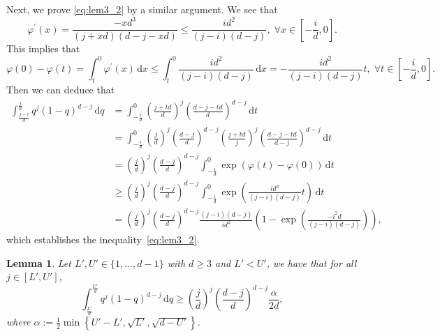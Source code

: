 \documentclass[onecolumn,letterpaper]{IEEEtran}
\newtheorem{lemma}{Lemma}
\newcommand{\cp}{{q}}
\newcommand{\up}{{U}}
\newcommand{\lw}{{L}}
\newcommand*{\dif}{{\,\mathrm{d}}}
\newcommand{\ap}{{\alpha}}
\newcommand{\gm}{{\varphi}}
\newcommand{\qp}{{t}}
\begin{document}
\begin{IEEEproof}
Next, we prove \eqref{eq:lem3_2} by a similar argument. We see that 
\begin{equation*}
\gm^\prime (x)  = \frac{-x d^3 }{(j+x d)(d-j-x d)} \le \frac{ i d^2 }{(j- i )(d-j)},\;\forall x \in \left[-\frac { i } {d},0\right]. 
\end{equation*}
This implies that 
\begin{equation*}
\gm(0)-\gm(\qp) = \int_\qp^0 \gm^\prime (x) \dif x \le \int_\qp^0 \frac{ i d^2 }{(j- i )(d-j)} \dif x = -\frac{ i d^2 }{(j- i )(d-j)} \qp,\;\forall \qp \in \left[-\frac  i  d,0\right].
\end{equation*}
Then we can deduce that 
\begin{align*}
\int_{\frac {j- i }{d} }^{\frac j d} \cp^j (1-\cp)^{d-j} \dif \cp &= \int_{-\frac { i } {d}}^0 \left( \frac{j+\qp d}{d} \right)^j \left( \frac{d-j-\qp d}{d} \right)^{d-j} \dif \qp \\ 
&= \int_{-\frac { i } {d}}^0 \left( \frac{j}{d} \right)^j \left( \frac{d-j}{d} \right)^{d-j}  \left( \frac{j+\qp d}{j} \right)^j \left( \frac{d-j-\qp d}{d-j} \right)^{d-j} \dif \qp \\ 
&= \left( \frac{j}{d} \right)^j \left( \frac{d-j}{d} \right)^{d-j}  \int_{-\frac { i } {d}}^0 \exp(\gm(\qp) - \gm(0)) \dif \qp \\ 
&\ge \left( \frac{j}{d} \right)^j \left( \frac{d-j}{d} \right)^{d-j}  \int_{-\frac { i } {d}}^0 \exp\left(\frac{ id^2  }{(j- i )(d-j)} \qp\right) \dif \qp \\ 
&= \left( \frac{j}{d} \right)^j \left( \frac{d-j}{d} \right)^{d-j} \frac{(j- i )(d-j)}{ i d^2 } \left( 1 - \exp\left( \frac{-  i ^2 d}{(j- i )(d-j)} \right) \right),
\end{align*}
which establishes the inequality~\eqref{eq:lem3_2}.
\end{IEEEproof}












\begin{lemma} \label{lem:int_U_L}
Let $\lw',\up' \in \{1, \dots, d-1\}$ with $d\geq 3$ and  $\lw' < \up'$, we have that for all $j \in [\lw',\up']$, 
\begin{equation*}
\int_{\frac {\lw'}{d}}^{\frac {\up'}{d}} \cp^j (1-\cp)^{d-j} \dif \cp \ge \left(\frac{j}{d}\right)^j \left(\frac{d-j}{d}\right)^{d-j} \frac{\ap}{2d},
\end{equation*}
where $\ap := \frac{1}{2} \min\left\{\up'-\lw' , \sqrt{\lw'} , \sqrt{d-\up'}\right\}$. 
\end{lemma}
\end{document}
